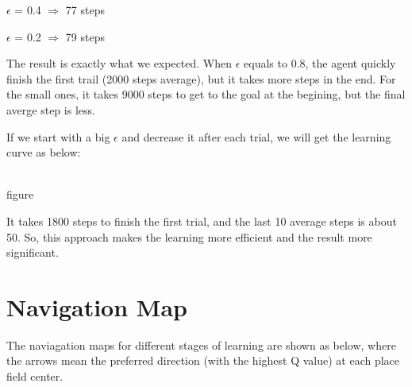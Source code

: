 \documentclass[a4paper, 12pt]{article}
\begin{document}
$\epsilon$ = 0.4 $\Rightarrow$ 77  steps

$\epsilon$ = 0.2 $\Rightarrow$ 79 steps

The result is exactly what we expected. When $\epsilon$ equals to 0.8, the agent quickly finish the first trail (2000 steps average), but it takes more steps in the end. For the small ones, it takes 9000 steps to get to the goal at the begining, but the final averge step is less.

If we start with a big $\epsilon$ and decrease it after each trial, we will get the learning curve as below:

\\ figure

It takes 1800 steps to finish the first trial, and the last 10 average steps is about 50. So, this approach makes the learning more efficient and the result more significant.

\section{Navigation Map}

The naviagation maps for different stages of learning are shown as below, where the arrows mean the preferred direction (with the highest Q value) at each place field center.
\end{document}
